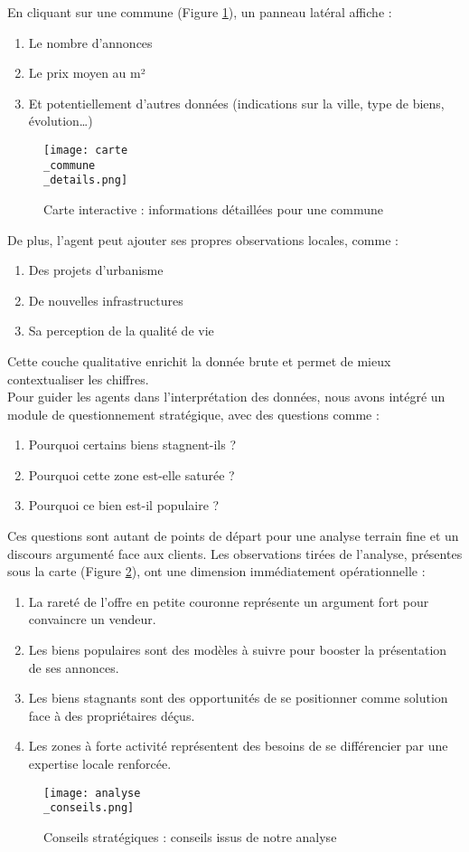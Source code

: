 \documentclass[a4paper, 12pt, twoside]{report}
\begin{document}
		En cliquant sur une commune (Figure \ref{carteCommuneDetails}), un panneau latéral affiche :
		\begin{enumerate}
			\item Le nombre d’annonces
			\item Le prix moyen au m²
			\item Et potentiellement d’autres données (indications sur la ville, type de biens, évolution…)
		\end{enumerate}
		\begin{figure}[h]
			\centering
			\texttt{[image: carte\\\_commune\\\_details.png]}
			\caption{Carte interactive : informations détaillées pour une commune}
			\label{carteCommuneDetails}
		\end{figure}	
		De plus, l’agent peut ajouter ses propres observations locales, comme :
		\begin{enumerate}
			\item Des projets d’urbanisme
			\item De nouvelles infrastructures
			\item Sa perception de la qualité de vie
		\end{enumerate}
		Cette couche qualitative enrichit la donnée brute et permet de mieux contextualiser les chiffres. \\

		Pour guider les agents dans l’interprétation des données, nous avons intégré un module de questionnement stratégique, avec des questions comme :
		\begin{enumerate}
			\item Pourquoi certains biens stagnent-ils ?
			\item Pourquoi cette zone est-elle saturée ?
			\item Pourquoi ce bien est-il populaire ?
		\end{enumerate}
		Ces questions sont autant de points de départ pour une analyse terrain fine et un discours argumenté face aux clients. Les observations tirées de l’analyse, présentes sous la carte (Figure \ref{conseils}), ont une dimension immédiatement opérationnelle :
		\begin{enumerate}
			\item La rareté de l’offre en petite couronne représente un argument fort pour convaincre un vendeur.
			\item Les biens populaires sont des modèles à suivre pour booster la présentation de ses annonces.
			\item Les biens stagnants sont des opportunités de se positionner comme solution face à des propriétaires déçus.
			\item Les zones à forte activité représentent des besoins de se différencier par une expertise locale renforcée.
		\end{enumerate}
		\begin{figure}[h]
			\centering
			\texttt{[image: analyse\\\_conseils.png]}
			\caption{Conseils stratégiques : conseils issus de notre analyse}
			\label{conseils}
		\end{figure}	
\end{document}

